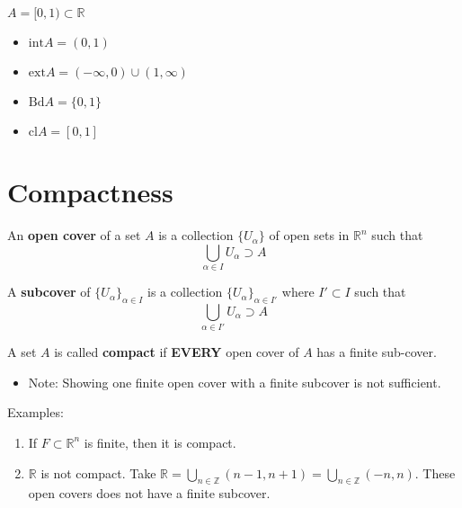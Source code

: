 \documentclass[a4paper]{article}
\numberwithin{equation}{section}
\newcommand{\R}{\mathbb{R}}
\newcommand{\Z}{\mathbb{Z}}
\begin{document}
\begin{example}
    $A=[0,1)\subset \R$
    \begin{itemize}
        \item $\mathrm{int} A=(0,1)$
        \item $\mathrm{ext} A=(-\infty,0)\cup(1,\infty)$
        \item $\mathrm{Bd} A= \{0,1\}$
        \item $\mathrm{cl} A=[0,1]$
    \end{itemize}
\end{example}
\section{Compactness}
\begin{definition}
    An \textbf{open cover} of a set $A$ is a collection $\{U_\alpha\}$ of open sets in $\R^n$ such that 
    \begin{equation}
        \bigcup_{\alpha\in I}U_\alpha\supset A
    \end{equation}

    A \textbf{subcover} of $\{U_\alpha\}_{\alpha\in I}$ is a collection $\{U_\alpha\}_{\alpha\in I'}$ where $I'\subset I$ such that 
    \begin{equation}
        \bigcup_{\alpha\in I'}U_\alpha\supset A
    \end{equation}
\end{definition}
\begin{definition}
    A set $A$ is called \textbf{compact} if \textbf{EVERY} open cover of $A$ has a finite sub-cover.
    \begin{itemize}
        \item Note: Showing one finite open cover with a finite subcover is not sufficient.
    \end{itemize}
    Examples:
    \begin{enumerate}
        \item If $F\subset\R^n$ is finite, then it is compact.
        \item $\R$ is not compact. Take $\R=\bigcup_{n\in\Z}(n-1,n+1)=\bigcup_{n\in\Z}(-n,n)$. These open covers does not have a finite subcover.
    \end{enumerate}
\end{definition}
\end{document}
